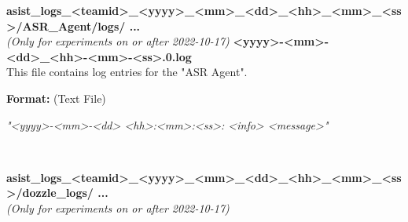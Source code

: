 \begin{description}
\label{ASR Agent logs}
\begin{addmargin}[0em]{0em} %
    \textbf{asist\_logs\_<teamid>\_<yyyy>\_<mm>\_<dd>\_<hh>\_<mm>\_<ss>/ASR\_Agent/logs/ ...}\\
    \textit{(Only for experiments on or after 2022-10-17)}
        \label{ASR Agent logs <yyyy>-<mm>-<dd>_<hh>-<mm>-<ss>.0.log}
        \textbf{<yyyy>-<mm>-<dd>\_<hh>-<mm>-<ss>.0.log}\\
        This file contains log entries for the "ASR Agent".
        \begin{addmargin}[1em]{0em}
            \textbf{Format:} (Text File)
            \begin{addmargin}[1em]{0em}
                \textit{"<yyyy>-<mm>-<dd> <hh>:<mm>:<ss>: <info> <message>"}
            \end{addmargin}
        \end{addmargin}
\end{addmargin} %
\textbf{\\}
\begin{addmargin}[0em]{0em} %
    \textbf{asist\_logs\_<teamid>\_<yyyy>\_<mm>\_<dd>\_<hh>\_<mm>\_<ss>/dozzle\_logs/ ...}\\
    \textit{(Only for experiments on or after 2022-10-17)}


\end{addmargin}
\end{description}
